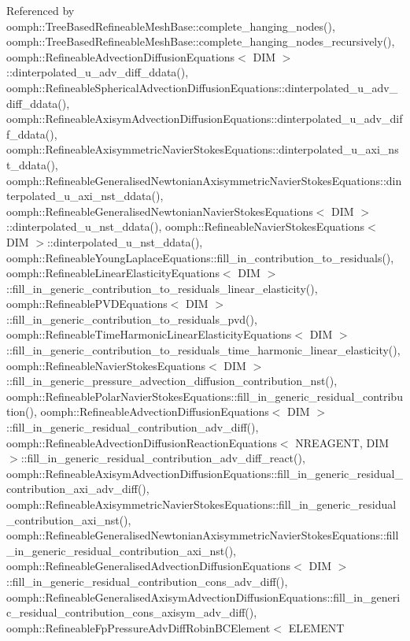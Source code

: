 Referenced by oomph\+::\+Tree\+Based\+Refineable\+Mesh\+Base\+::complete\+\_\+hanging\+\_\+nodes(), oomph\+::\+Tree\+Based\+Refineable\+Mesh\+Base\+::complete\+\_\+hanging\+\_\+nodes\+\_\+recursively(), oomph\+::\+Refineable\+Advection\+Diffusion\+Equations$<$ D\+I\+M $>$\+::dinterpolated\+\_\+u\+\_\+adv\+\_\+diff\+\_\+ddata(), oomph\+::\+Refineable\+Spherical\+Advection\+Diffusion\+Equations\+::dinterpolated\+\_\+u\+\_\+adv\+\_\+diff\+\_\+ddata(), oomph\+::\+Refineable\+Axisym\+Advection\+Diffusion\+Equations\+::dinterpolated\+\_\+u\+\_\+adv\+\_\+diff\+\_\+ddata(), oomph\+::\+Refineable\+Axisymmetric\+Navier\+Stokes\+Equations\+::dinterpolated\+\_\+u\+\_\+axi\+\_\+nst\+\_\+ddata(), oomph\+::\+Refineable\+Generalised\+Newtonian\+Axisymmetric\+Navier\+Stokes\+Equations\+::dinterpolated\+\_\+u\+\_\+axi\+\_\+nst\+\_\+ddata(), oomph\+::\+Refineable\+Generalised\+Newtonian\+Navier\+Stokes\+Equations$<$ D\+I\+M $>$\+::dinterpolated\+\_\+u\+\_\+nst\+\_\+ddata(), oomph\+::\+Refineable\+Navier\+Stokes\+Equations$<$ D\+I\+M $>$\+::dinterpolated\+\_\+u\+\_\+nst\+\_\+ddata(), oomph\+::\+Refineable\+Young\+Laplace\+Equations\+::fill\+\_\+in\+\_\+contribution\+\_\+to\+\_\+residuals(), oomph\+::\+Refineable\+Linear\+Elasticity\+Equations$<$ D\+I\+M $>$\+::fill\+\_\+in\+\_\+generic\+\_\+contribution\+\_\+to\+\_\+residuals\+\_\+linear\+\_\+elasticity(), oomph\+::\+Refineable\+P\+V\+D\+Equations$<$ D\+I\+M $>$\+::fill\+\_\+in\+\_\+generic\+\_\+contribution\+\_\+to\+\_\+residuals\+\_\+pvd(), oomph\+::\+Refineable\+Time\+Harmonic\+Linear\+Elasticity\+Equations$<$ D\+I\+M $>$\+::fill\+\_\+in\+\_\+generic\+\_\+contribution\+\_\+to\+\_\+residuals\+\_\+time\+\_\+harmonic\+\_\+linear\+\_\+elasticity(), oomph\+::\+Refineable\+Navier\+Stokes\+Equations$<$ D\+I\+M $>$\+::fill\+\_\+in\+\_\+generic\+\_\+pressure\+\_\+advection\+\_\+diffusion\+\_\+contribution\+\_\+nst(), oomph\+::\+Refineable\+Polar\+Navier\+Stokes\+Equations\+::fill\+\_\+in\+\_\+generic\+\_\+residual\+\_\+contribution(), oomph\+::\+Refineable\+Advection\+Diffusion\+Equations$<$ D\+I\+M $>$\+::fill\+\_\+in\+\_\+generic\+\_\+residual\+\_\+contribution\+\_\+adv\+\_\+diff(), oomph\+::\+Refineable\+Advection\+Diffusion\+Reaction\+Equations$<$ N\+R\+E\+A\+G\+E\+N\+T, D\+I\+M $>$\+::fill\+\_\+in\+\_\+generic\+\_\+residual\+\_\+contribution\+\_\+adv\+\_\+diff\+\_\+react(), oomph\+::\+Refineable\+Axisym\+Advection\+Diffusion\+Equations\+::fill\+\_\+in\+\_\+generic\+\_\+residual\+\_\+contribution\+\_\+axi\+\_\+adv\+\_\+diff(), oomph\+::\+Refineable\+Axisymmetric\+Navier\+Stokes\+Equations\+::fill\+\_\+in\+\_\+generic\+\_\+residual\+\_\+contribution\+\_\+axi\+\_\+nst(), oomph\+::\+Refineable\+Generalised\+Newtonian\+Axisymmetric\+Navier\+Stokes\+Equations\+::fill\+\_\+in\+\_\+generic\+\_\+residual\+\_\+contribution\+\_\+axi\+\_\+nst(), oomph\+::\+Refineable\+Generalised\+Advection\+Diffusion\+Equations$<$ D\+I\+M $>$\+::fill\+\_\+in\+\_\+generic\+\_\+residual\+\_\+contribution\+\_\+cons\+\_\+adv\+\_\+diff(), oomph\+::\+Refineable\+Generalised\+Axisym\+Advection\+Diffusion\+Equations\+::fill\+\_\+in\+\_\+generic\+\_\+residual\+\_\+contribution\+\_\+cons\+\_\+axisym\+\_\+adv\+\_\+diff(), oomph\+::\+Refineable\+Fp\+Pressure\+Adv\+Diff\+Robin\+B\+C\+Element$<$ E\+L\+E\+M\+E\+N\+T 